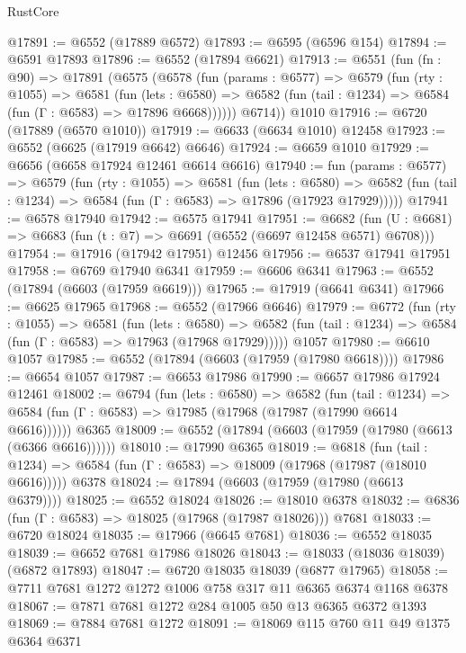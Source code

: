 \begin{lexlean}{RustCore}
\begin{coremodule}
@17891 := @6552 (@17889 @6572)
@17893 := @6595 (@6596 @154)
@17894 := @6591 @17893
@17896 := @6552 (@17894 @6621)
@17913 := @6551
    (fun (fn : @90) =>
    @17891
      (@6575
        (@6578
          (fun (params : @6577) =>
          @6579
            (fun (rty : @1055) =>
            @6581
              (fun (lets : @6580) =>
              @6582 (fun (tail : @1234) => @6584 (fun (Γ : @6583) => @17896 @6668))))))
        @6714))
    @1010
@17916 := @6720 (@17889 (@6570 @1010))
@17919 := @6633 (@6634 @1010) @12458
@17923 := @6552 (@6625 (@17919 @6642) @6646)
@17924 := @6659 @1010
@17929 := @6656 (@6658 @17924 @12461 @6614 @6616)
@17940 := fun (params : @6577) =>
  @6579
    (fun (rty : @1055) =>
    @6581
      (fun (lets : @6580) =>
      @6582 (fun (tail : @1234) => @6584 (fun (Γ : @6583) => @17896 (@17923 @17929)))))
@17941 := @6578 @17940
@17942 := @6575 @17941
@17951 := @6682
    (fun (U : @6681) => @6683 (fun (t : @7) => @6691 (@6552 (@6697 @12458 @6571) @6708)))
@17954 := @17916 (@17942 @17951) @12456
@17956 := @6537 @17941 @17951
@17958 := @6769 @17940 @6341
@17959 := @6606 @6341
@17963 := @6552 (@17894 (@6603 (@17959 @6619)))
@17965 := @17919 (@6641 @6341)
@17966 := @6625 @17965
@17968 := @6552 (@17966 @6646)
@17979 := @6772
    (fun (rty : @1055) =>
    @6581
      (fun (lets : @6580) =>
      @6582 (fun (tail : @1234) => @6584 (fun (Γ : @6583) => @17963 (@17968 @17929)))))
    @1057
@17980 := @6610 @1057
@17985 := @6552 (@17894 (@6603 (@17959 (@17980 @6618))))
@17986 := @6654 @1057
@17987 := @6653 @17986
@17990 := @6657 @17986 @17924 @12461
@18002 := @6794
    (fun (lets : @6580) =>
    @6582
      (fun (tail : @1234) =>
      @6584 (fun (Γ : @6583) => @17985 (@17968 (@17987 (@17990 @6614 @6616))))))
    @6365
@18009 := @6552 (@17894 (@6603 (@17959 (@17980 (@6613 (@6366 @6616))))))
@18010 := @17990 @6365
@18019 := @6818
    (fun (tail : @1234) => @6584 (fun (Γ : @6583) => @18009 (@17968 (@17987 (@18010 @6616)))))
    @6378
@18024 := @17894 (@6603 (@17959 (@17980 (@6613 @6379))))
@18025 := @6552 @18024
@18026 := @18010 @6378
@18032 := @6836 (fun (Γ : @6583) => @18025 (@17968 (@17987 @18026))) @7681
@18033 := @6720 @18024
@18035 := @17966 (@6645 @7681)
@18036 := @6552 @18035
@18039 := @6652 @7681 @17986 @18026
@18043 := @18033 (@18036 @18039) (@6872 @17893)
@18047 := @6720 @18035 @18039 (@6877 @17965)
@18058 := @7711 @7681 @1272 @1272 @1006 @758 @317 @11 @6365 @6374 @1168 @6378
@18067 := @7871 @7681 @1272 @284 @1005 @50 @13 @6365 @6372 @1393
@18069 := @7884 @7681 @1272
@18091 := @18069
    @115
    @760
    @11
    @49
    @1375
    @6364
    @6371

\end{coremodule}
\end{lexlean}
